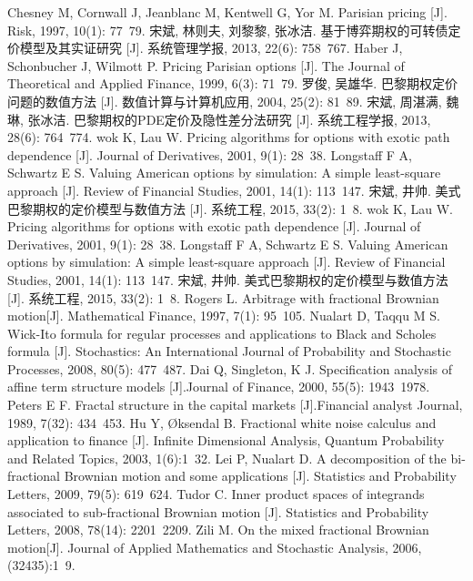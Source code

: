 \documentclass{ctexart} %
\begin{document}
\begin{thebibliography}{10}
Chesney M, Cornwall J, Jeanblanc M, Kentwell G, Yor M. Parisian pricing [J]. Risk, 1997, 10(1): 77~79.
宋斌, 林则夫, 刘黎黎, 张冰洁. 基于博弈期权的可转债定价模型及其实证研究 [J]. 系统管理学报, 2013, 22(6): 758~767.
Haber J, Schonbucher J, Wilmott P. Pricing Parisian options [J]. The Journal of Theoretical and Applied Finance, 1999, 6(3): 71~79.
罗俊, 吴雄华. 巴黎期权定价问题的数值方法 [J]. 数值计算与计算机应用, 2004, 25(2): 81~89.
宋斌, 周湛满, 魏琳, 张冰洁. 巴黎期权的PDE定价及隐性差分法研究 [J]. 系统工程学报, 2013, 28(6): 764~774.
wok K, Lau W. Pricing algorithms for options with exotic path dependence [J]. Journal of Derivatives, 2001, 9(1): 28~38.
Longstaff F A, Schwartz E S. Valuing American options by simulation: A simple least-square approach [J]. Review of Financial Studies, 2001, 14(1): 113~147.
宋斌, 井帅. 美式巴黎期权的定价模型与数值方法 [J]. 系统工程, 2015, 33(2): 1~8.
wok K, Lau W. Pricing algorithms for options with exotic path dependence [J]. Journal of Derivatives, 2001, 9(1): 28~38.
Longstaff F A, Schwartz E S. Valuing American options by simulation: A simple least-square approach [J]. Review of Financial Studies, 2001, 14(1): 113~147.
宋斌, 井帅. 美式巴黎期权的定价模型与数值方法 [J]. 系统工程, 2015, 33(2): 1~8.
 Rogers L. Arbitrage with fractional Brownian motion[J]. Mathematical Finance, 1997, 7(1): 95~105.
 Nualart D, Taqqu M S. Wick-Ito formula for regular processes and applications to Black and Scholes formula [J]. Stochastics: An International Journal of Probability and Stochastic Processes, 2008, 80(5): 477~487.
 Dai Q, Singleton, K J. Specification analysis of affine term structure models [J].Journal of Finance, 2000, 55(5): 1943~1978.
 Peters E F. Fractal structure in the capital markets [J].Financial analyst Journal, 1989, 7(32): 434~453.
 Hu Y, Øksendal B. Fractional white noise calculus and application to finance [J]. Infinite Dimensional Analysis, Quantum Probability and Related Topics, 2003, 1(6):1~32.
Lei P, Nualart D. A decomposition of the bi-fractional Brownian motion and some applications [J]. Statistics and Probability Letters, 2009, 79(5): 619~624.
 Tudor C. Inner product spaces of integrands associated to sub-fractional Brownian motion [J]. Statistics and Probability Letters, 2008, 78(14): 2201~2209.
 Zili M. On the mixed fractional Brownian motion[J]. Journal of Applied Mathematics and Stochastic Analysis, 2006, (32435):1~9.


\end{thebibliography}
\end{document}
